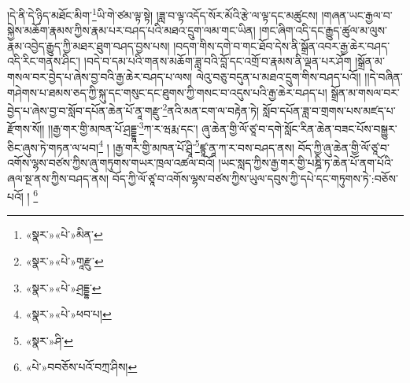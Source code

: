 །དེ་ནི་དེ་ཉིད་མཐོང་མིག་\footnote{«སྣར་»«པེ་»མིན་}ཡི་གེ་ཙམ་ལྟ་སྟེ། །ཟླ་བ་ལྟ་འདོད་སོར་མོའི་རྩེ་ལ་ལྟ་དང་མཚུངས། །གཞན་ཡང་རྒྱལ་བ་སྐྱེས་མཆོག་རྣམས་ཀྱིས་རྣམ་པར་བཤད་པའི་མཐའ་དྲུག་ལམ་གང་ཡིན། །གང་ཞིག་འདི་དང་རྒྱུད་ཚུལ་མ་ལུས་རྣམ་འབྱེད་རྒྱུད་ཀྱི་མཐར་ཐུག་བཤད་བྱས་པས། །བདག་གིས་དགེ་བ་གང་ཐོབ་དེས་ནི་སྒྲོན་འབར་རྒྱ་ཆེར་བཤད་འདི་རིང་གནས་ཤིང་། །བདེ་བ་དམ་པའི་གནས་མཆོག་ཟླ་བའི་བློ་དང་འགྲོ་བ་རྣམས་ནི་ལྡན་པར་ཤོག །སྒྲོན་མ་གསལ་བར་བྱེད་པ་ཞེས་བྱ་བའི་རྒྱ་ཆེར་བཤད་པ་ལས། ལེའུ་བཅུ་བདུན་པ་མཐའ་དྲུག་གིས་བཤད་པའོ།། །།དེ་བཞིན་གཤེགས་པ་ཐམས་ཅད་ཀྱི་སྐུ་དང་གསུང་དང་ཐུགས་ཀྱི་གསང་བ་འདུས་པའི་རྒྱ་ཆེར་བཤད་པ། སྒྲོན་མ་གསལ་བར་བྱེད་པ་ཞེས་བྱ་བ་སློབ་དཔོན་ཆེན་པོ་ནཱ་གརྫུ་\footnote{«སྣར་»«པེ་»གཱརྫུ་}ནའི་མན་ངག་ལ་བརྟེན་ཏེ། སློབ་དཔོན་ཟླ་བ་གྲགས་པས་མཛད་པ་རྫོགས་སོ།། །།རྒྱ་གར་གྱི་མཁན་པོ་ཤྲདྡྷཱ་\footnote{«སྣར་»«པེ་»ཤྲདྡྷ་}ཀ་ར་ཝརྨ་དང་། ཞུ་ཆེན་གྱི་ལོ་ཙཱ་བ་དགེ་སློང་རིན་ཆེན་བཟང་པོས་བསྒྱུར་ཅིང་ཞུས་ཏེ་གཏན་ལ་ཕབ།\footnote{«སྣར་»«པེ་»ཕབ་པ།} ། །རྒྱ་གར་གྱི་མཁན་པོ་ཤྲཱི་\footnote{«སྣར་»ཤི་}ཛྙཱ་ནཱ་ཀ་ར་བས་བཤད་ནས། བོད་ཀྱི་ཞུ་ཆེན་གྱི་ལོ་ཙཱ་བ་འགོས་ལྷས་བཙས་ཀྱིས་ཞུ་གཏུགས་གཡར་ཁྲལ་འཚལ་བའོ། །ཡང་སླད་ཀྱིས་རྒྱ་གར་གྱི་པཎྜི་ཏ་ཆེན་པོ་ནག་པོའི་ཞལ་སྔ་ནས་ཀྱིས་བཤད་ནས། བོད་ཀྱི་ལོ་ཙཱ་བ་འགོས་ལྷས་བཙས་ཀྱིས་ཡུལ་དབུས་ཀྱི་དཔེ་དང་གཏུགས་ཏེ་:བཅོས་པའོ། ། \footnote{«པེ་»བབཅོས་པའོ་བཀྲ་ཤིས། }